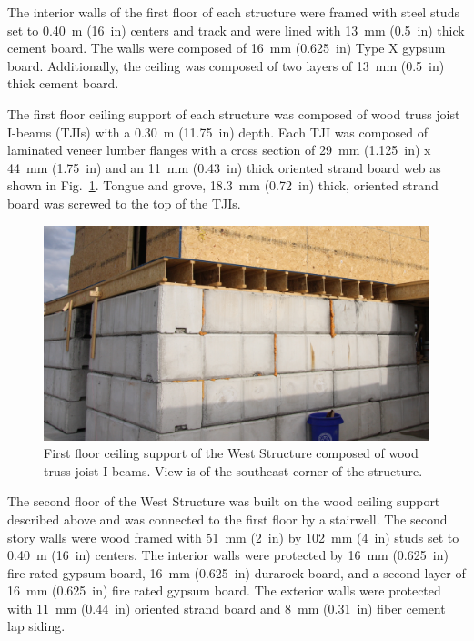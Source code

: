 \documentclass[12pt,oneside]{book}
\begin{document}
The interior walls of the first floor of each structure were framed with steel studs set to 0.40~m (16~in) centers and track and were lined with 13~mm (0.5~in) thick cement board. The walls were composed of 16~mm (0.625~in) Type X gypsum board. Additionally, the ceiling was composed of two layers of 13~mm (0.5~in) thick cement board.
\FloatBarrier

The first floor ceiling support of each structure was composed of wood truss joist I-beams (TJIs) with a 0.30~m (11.75~in) depth. Each TJI was composed of laminated veneer lumber flanges with a cross section of 29~mm (1.125~in) x 44~mm (1.75~in) and an 11~mm (0.43~in) thick oriented strand board web as shown in Fig.~\ref{fig:TJI}. Tongue and grove, 18.3~mm (0.72~in) thick, oriented strand board was screwed to the top of the TJIs.

\begin{figure}[!ht]
	\includegraphics[width=6in]{../../Hose_Stream_Tests/Figures/Pictures/TJI_support}
	\caption[Ceiling support of the West Structure.]{First floor ceiling support of the West Structure composed of wood truss joist I-beams. View is of the southeast corner of the structure.}
	\label{fig:TJI}
\end{figure}
\FloatBarrier


The second floor of the West Structure was built on the wood ceiling support described above and was connected to the first floor by a stairwell. The second story walls were wood framed with 51~mm (2~in) by 102~mm (4~in) studs set to 0.40~m (16~in) centers. The interior walls were protected by 16~mm (0.625~in) fire rated gypsum board, 16~mm (0.625~in) durarock board, and a second layer of 16~mm (0.625~in) fire rated gypsum board. The exterior walls were protected with 11~mm (0.44~in) oriented strand board and 8~mm (0.31~in) fiber cement lap siding.
\end{document}
